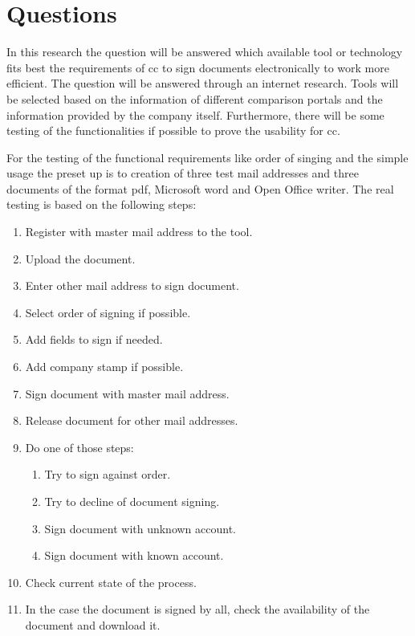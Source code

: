 \section{Questions}

In this research the question will be answered which available tool or technology fits best the requirements of \gls{cc} to sign documents electronically to work more efficient. The  question will be answered through an internet research. Tools will be selected based on the information of different comparison portals and the information provided by the company itself. Furthermore, there will be some testing of the functionalities if possible to prove the usability for \gls{cc}. 

For the testing of the functional requirements like order of singing and the simple usage the preset up is to creation of three test mail addresses and three documents of the format \gls{pdf}, Microsoft word and Open Office writer. The real testing is based on the following steps:
\begin{enumerate}
	\item Register with master mail address to the tool.
	\item Upload the document.
	\item Enter other mail address to sign document.
	\item Select order of signing if possible.
	\item Add fields to sign if needed.
	\item Add company stamp if possible.
	\item Sign document with master mail address.
	\item Release document for other mail addresses.
	\item Do one of those steps:
	\begin{enumerate}
		\item Try to sign against order.
		\item Try to decline of document signing.
		\item Sign document with unknown account.
		\item Sign document with known account. 
	\end{enumerate}
	\item Check current state of the process.
	\item In the case the document is signed by all, check the availability of the document and download it.
\end{enumerate}